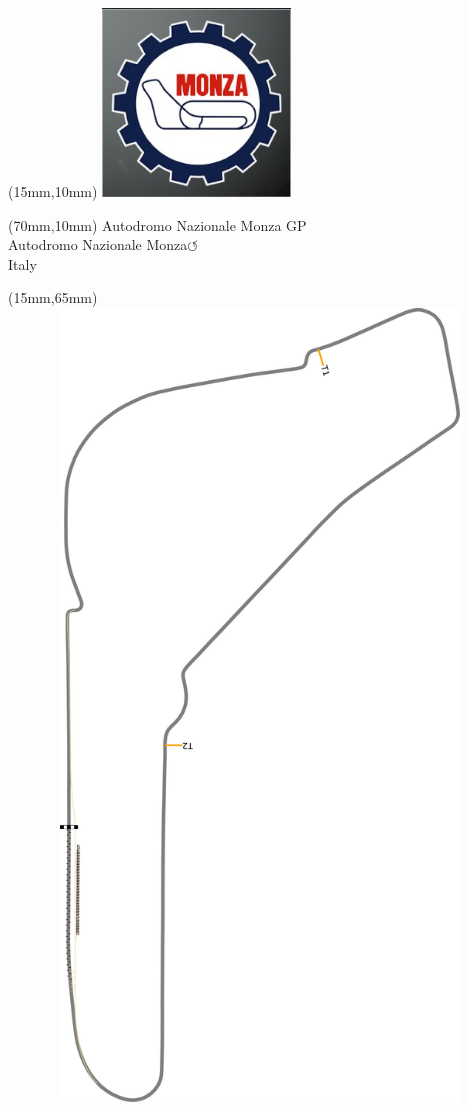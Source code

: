 \begin{textblock*}{50mm}(15mm,10mm)%
\includegraphics[width=50mm]{LG/2015-05-20_00086.png}
\end{textblock*}
\begin{textblock*}{130mm}(70mm,10mm)%
{\fontsize{20}{20}\selectfont Autodromo Nazionale Monza GP\\}
{\fontsize{16}{16}\selectfont Autodromo Nazionale Monza\hfill \huge$\circlearrowleft$\\}
{\fontsize{12}{12}\selectfont Italy\\}
\end{textblock*}
\begin{textblock*}{185mm}(15mm,65mm)%
\centering
\mbox{\includegraphics[width=185mm,height=210mm,keepaspectratio]{PT/ANMOGP.pdf}}
\end{textblock*}
